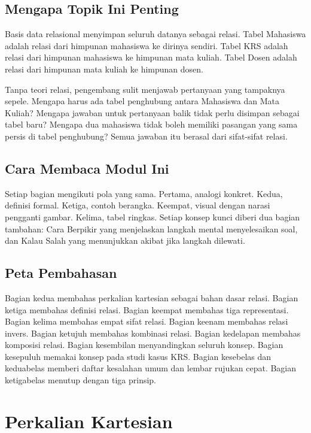 \documentclass[11pt,a4paper]{article}
\begin{document}
\subsection{Mengapa Topik Ini Penting}

Basis data relasional menyimpan seluruh datanya sebagai relasi. Tabel Mahasiswa adalah relasi dari himpunan mahasiswa ke dirinya sendiri. Tabel KRS adalah relasi dari himpunan mahasiswa ke himpunan mata kuliah. Tabel Dosen adalah relasi dari himpunan mata kuliah ke himpunan dosen.

Tanpa teori relasi, pengembang sulit menjawab pertanyaan yang tampaknya sepele. Mengapa harus ada tabel penghubung antara Mahasiswa dan Mata Kuliah? Mengapa jawaban untuk pertanyaan balik tidak perlu disimpan sebagai tabel baru? Mengapa dua mahasiswa tidak boleh memiliki pasangan yang sama persis di tabel penghubung? Semua jawaban itu berasal dari sifat-sifat relasi.

\subsection{Cara Membaca Modul Ini}

Setiap bagian mengikuti pola yang sama. Pertama, analogi konkret. Kedua, definisi formal. Ketiga, contoh berangka. Keempat, visual dengan narasi pengganti gambar. Kelima, tabel ringkas. Setiap konsep kunci diberi dua bagian tambahan: Cara Berpikir yang menjelaskan langkah mental menyelesaikan soal, dan Kalau Salah yang menunjukkan akibat jika langkah dilewati.

\subsection{Peta Pembahasan}

Bagian kedua membahas perkalian kartesian sebagai bahan dasar relasi. Bagian ketiga membahas definisi relasi. Bagian keempat membahas tiga representasi. Bagian kelima membahas empat sifat relasi. Bagian keenam membahas relasi invers. Bagian ketujuh membahas kombinasi relasi. Bagian kedelapan membahas komposisi relasi. Bagian kesembilan menyandingkan seluruh konsep. Bagian kesepuluh memakai konsep pada studi kasus KRS. Bagian kesebelas dan keduabelas memberi daftar kesalahan umum dan lembar rujukan cepat. Bagian ketigabelas menutup dengan tiga prinsip.

\section{Perkalian Kartesian}
\end{document}

